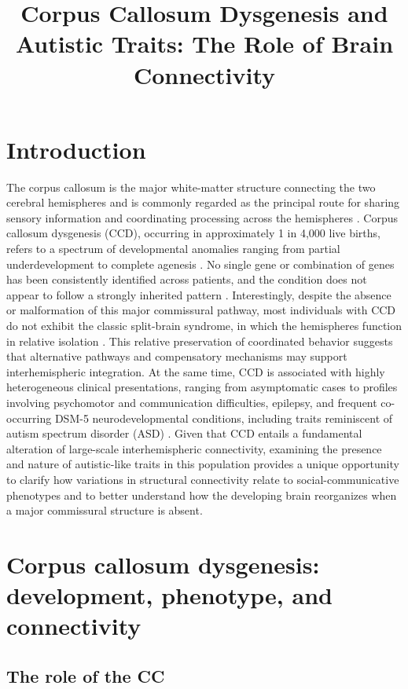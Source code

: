 \documentclass{article}
\title{Corpus Callosum Dysgenesis and Autistic Traits: The Role of Brain Connectivity}
\date{}
\begin{document}
\maketitle

\section{Introduction}

The corpus callosum is the major white-matter structure connecting the two cerebral hemispheres and is commonly regarded as the principal route for sharing sensory information and coordinating processing across the hemispheres \citep{Banich1998}. Corpus callosum dysgenesis (CCD), occurring in approximately 1 in 4,000 live births, refers to a spectrum of developmental anomalies ranging from partial underdevelopment to complete agenesis \citep{Paul2007}. No single gene or combination of genes has been consistently identified across patients, and the condition does not appear to follow a strongly inherited pattern \citep{Lau2013}. Interestingly, despite the absence or malformation of this major commissural pathway, most individuals with CCD do not exhibit the classic split-brain syndrome, in which the hemispheres function in relative isolation \citep{Brown2019}. This relative preservation of coordinated behavior suggests that alternative pathways and compensatory mechanisms may support interhemispheric integration. At the same time, CCD is associated with highly heterogeneous clinical presentations, ranging from asymptomatic cases to profiles involving psychomotor and communication difficulties, epilepsy, and frequent co-occurring DSM-5 neurodevelopmental conditions, including traits reminiscent of autism spectrum disorder (ASD) \citep{Hantzsch2023}. Given that CCD entails a fundamental alteration of large-scale interhemispheric connectivity, examining the presence and nature of autistic-like traits in this population provides a unique opportunity to clarify how variations in structural connectivity relate to social-communicative phenotypes and to better understand how the developing brain reorganizes when a major commissural structure is absent.

\section{Corpus callosum dysgenesis: development, phenotype, and connectivity}

\subsection{The role of the CC}
\end{document}

